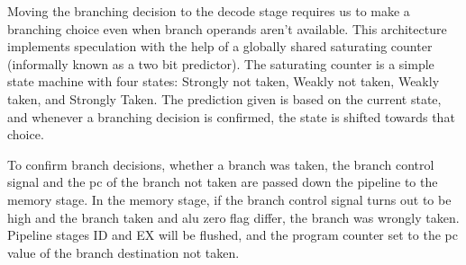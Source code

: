 Moving the branching decision to the decode stage requires us to make a branching choice even when branch operands aren't available.
This architecture implements speculation with the help of a globally shared saturating counter (informally known as a two bit predictor).
The saturating counter is a simple state machine with four states: Strongly not taken, Weakly not taken, Weakly taken, and Strongly Taken.
The prediction given is based on the current state, and whenever a branching decision is confirmed, the state is shifted towards that choice.

To confirm branch decisions, whether a branch was taken, the branch control signal and the pc of the branch not taken are passed down the pipeline to the memory stage.
In the memory stage, if the branch control signal turns out to be high and the branch taken and alu zero flag differ, the branch was wrongly taken.
Pipeline stages ID and EX will be flushed, and the program counter set to the pc value of the branch destination not taken.

